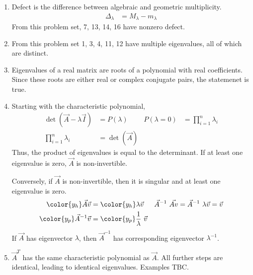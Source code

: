 \begin{enumerate}
    \item Defect is the difference between algebraic and geometric multiplicity.
          \begin{align}
              \Delta_\lambda & = M_\lambda - m_\lambda
          \end{align}
          From this problem set, 7, 13, 14, 16 have nonzero defect.

    \item From this problem set 1, 3, 4, 11, 12 have multiple eigenvalues, all of
          which are distinct.

    \item Eigenvalues of a real matrix are roots of a polynomial with real coefficients.
          Since these roots are either real or complex conjugate pairs, the statemenet
          is true.

    \item Starting with the characteristic polynomial,
          \begin{align}
              \det(\vec{A} - \lambda \vec{I}) & = P(\lambda)                &
              P(\lambda = 0)                  & = \prod_{i=1}^{n} \lambda_i   \\
              \prod_{i=1}^{n} \lambda_i       & = \det(\vec{A})
          \end{align}
          Thus, the product of eigenvalues is equal to the determinant. If at least one
          eigenvalue is zero, $\vec{A}$ is non-invertible. \par
          Conversely, if $ \vec{A} $ is non-invertible, then it is singular and at least
          one eigenvalue is zero.
          \begin{align}
              {\color{y_h} \vec{A}}\vec{v}       & = {\color{y_h}
              \lambda} \vec{v}                   &
              \vec{A}^{-1}\ \vec{Av}             & = \vec{A}^{-1}
              \ \lambda \vec{v} = \vec{v}                         \\
              {\color{y_p} \vec{A}^{-1}} \vec{v} & = {\color{y_p}
              \frac{1}{\lambda}}\ \vec{v}
          \end{align}
          If $ \vec{A} $ has eigenvector $ \lambda $, then $ \vec{A}^{-1} $ has
          corresponding eigenvector $ \lambda^{-1} $.

    \item $ \vec{A}^T $ has the same characteristic polynomial as $ \vec{A} $. All
          further steps are identical, leading to identical eigenvalues. Examples TBC.
\end{enumerate}